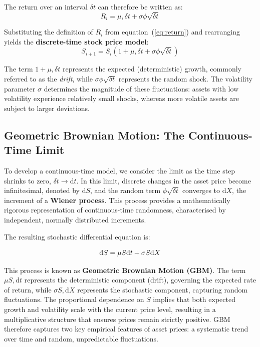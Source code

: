 \documentclass[12pt]{article}
\begin{document}
The return over an interval $\delta t$ can therefore be written as:
\begin{equation}
R_i = \mu,\delta t + \sigma \phi \sqrt{\delta t}
\label{eq:return_scaled}
\end{equation}

Substituting the definition of $R_i$ from equation~(\ref{eq:return}) and rearranging yields the \textbf{discrete-time stock price model}:
\begin{equation}
S_{i+1} = S_i \left(1 + \mu,\delta t + \sigma \phi \sqrt{\delta t}\right)
\label{eq:discrete_gbm}
\end{equation}

The term $1 + \mu,\delta t$ represents the expected (deterministic) growth, commonly referred to as the \textit{drift}, while $\sigma \phi \sqrt{\delta t}$ represents the random shock. The volatility parameter $\sigma$ determines the magnitude of these fluctuations: assets with low volatility experience relatively small shocks, whereas more volatile assets are subject to larger deviations.

\subsection{Geometric Brownian Motion: The Continuous-Time Limit}
\label{sec:gbm}
To develop a continuous-time model, we consider the limit as the time step shrinks to zero, $\delta t \to \mathrm{d}t$. In this limit, discrete changes in the asset price become infinitesimal, denoted by $\mathrm{d}S$, and the random term $\phi \sqrt{\delta t}$ converges to $\mathrm{d}X$, the increment of a \textbf{Wiener process}. This process provides a mathematically rigorous representation of continuous-time randomness, characterised by independent, normally distributed increments.

The resulting stochastic differential equation is:
\begin{eqbox}
\begin{equation}
\mathrm{d}S = \mu S \space \mathrm{d}t + \sigma S \space\mathrm{d}X
\label{eq:gbm}
\end{equation}
\end{eqbox}

This process is known as \textbf{Geometric Brownian Motion (GBM)}. The term $\mu S ,\mathrm{d}t$ represents the deterministic component (drift), governing the expected rate of return, while $\sigma S ,\mathrm{d}X$ represents the stochastic component, capturing random fluctuations. The proportional dependence on $S$ implies that both expected growth and volatility scale with the current price level, resulting in a multiplicative structure that ensures prices remain strictly positive. GBM therefore captures two key empirical features of asset prices: a systematic trend over time and random, unpredictable fluctuations.
\end{document}

